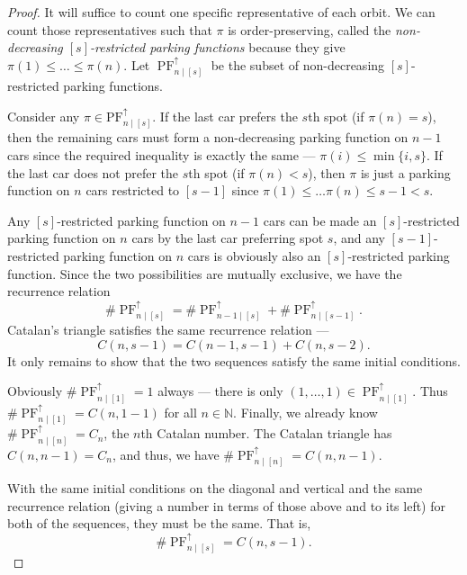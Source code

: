 \documentclass[12 pt]{amsart}
\theoremstyle{definition} %
\theoremstyle{remark} %
\begin{document}
\begin{proof}
	It will suffice to count one specific representative of each orbit. We can count those representatives such that $\pi$ is order-preserving, called the \emph{non-decreasing $[s]$-restricted parking functions} because they give $\pi(1) \le \dots \le \pi(n)$. Let $\operatorname{PF}_{n \mid [s]}^{\uparrow}$ be the subset of non-decreasing $[s]$-restricted parking functions.

	Consider any $\pi \in \mathrm{PF}_{n \mid [s]}^{\uparrow}$. If the last car prefers the $s$th spot (if $\pi(n) = s$), then the remaining cars must form a non-decreasing parking function on $n - 1$ cars since the required inequality is exactly the same --- $\pi(i) \le \min \{ i, s \}$. If the last car does not prefer the $s$th spot (if $\pi(n) < s$), then $\pi$ is just a parking function on $n$ cars restricted to $[s - 1]$ since $\pi(1) \le \dots \pi(n) \le s - 1 < s$.

	Any $[s]$-restricted parking function on $n - 1$ cars can be made an $[s]$-restricted parking function on $n$ cars by the last car preferring spot $s$, and any $[s - 1]$-restricted parking function on $n$ cars is obviously also an $[s]$-restricted parking function. Since the two possibilities are mutually exclusive, we have the recurrence relation
	\[
		\# \operatorname{PF}_{n \mid [s]}^{\uparrow} = \# \operatorname{PF}_{n - 1 \mid [s]}^{\uparrow} + \# \operatorname{PF}_{n \mid [s - 1]}^{\uparrow} .
	\]
	Catalan's triangle satisfies the same recurrence relation \cite{bailey-1996} ---
	\[
		C(n, s - 1) = C(n - 1, s - 1) + C(n, s - 2).
	\]
	It only remains to show that the two sequences satisfy the same initial conditions.

	Obviously $\# \operatorname{PF}_{n \mid [1]}^{\uparrow}  = 1$ always --- there is only $(1, \dots, 1) \in \operatorname{PF}_{n \mid [1]}^{\uparrow}$. Thus $\# \operatorname{PF}_{n \mid [1]}^{\uparrow}  = C(n, 1 - 1)$ for all $n \in \mathbb{N}$. Finally, we already know $\# \operatorname{PF}_{n \mid [n]}^{\uparrow}  = C_{n}$, the $n$th Catalan number. The Catalan triangle has $C(n, n - 1) = C_{n}$, and thus, we have $\# \operatorname{PF}_{n \mid [n]}^{\uparrow} = C(n, n - 1)$.

	With the same initial conditions on the diagonal and vertical and the same recurrence relation (giving a number in terms of those above and to its left) for both of the sequences, they must be the same. That is,
	\[
		 \# \operatorname{PF}_{n \mid [s]}^{\uparrow} = C(n, s - 1).
	\]
\end{proof}
\end{document}

